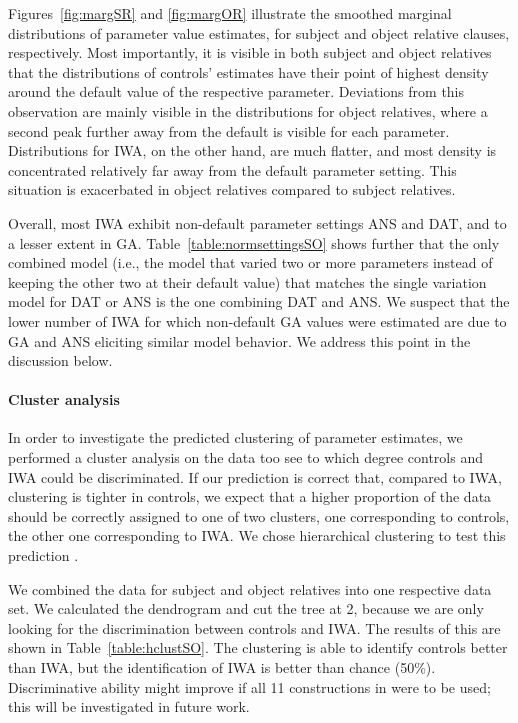 \documentclass{cambridge7A}\usepackage[]{graphicx}\usepackage[]{color}
\begin{document}
Figures~\ref{fig:margSR} and \ref{fig:margOR} illustrate the smoothed marginal distributions of parameter value estimates, for subject and object relative clauses, respectively. Most importantly, it is visible in both subject and object relatives that the distributions of controls' estimates have their point of highest density around the default value of the respective parameter. Deviations from this observation are mainly visible in the distributions for object relatives, where a second peak further away from the default is visible for each parameter. Distributions for IWA, on the other hand, are much flatter, and most density is concentrated relatively far away from the default parameter setting. This situation is exacerbated in object relatives compared to subject relatives.

Overall, most IWA exhibit non-default parameter settings ANS and DAT, and to a lesser extent in GA. Table~\ref{table:normsettingsSO} shows further that the only combined model (i.e., the model that varied two or more parameters instead of keeping the other two at their default value) that matches the single variation model for DAT or ANS is the one combining DAT and ANS. We suspect that the lower number of IWA for which non-default GA values were estimated are due to GA and ANS eliciting similar model behavior.
We address this point in the discussion below.

\paragraph{Cluster analysis} In order to investigate the
 predicted clustering of parameter estimates, we performed a cluster analysis on the data too see to which degree controls and IWA could be discriminated.
If our prediction is correct that, compared to IWA, clustering is tighter in controls, we expect that a higher proportion of the data should be correctly assigned to one of two clusters, one corresponding to controls, the other one corresponding to IWA. We chose hierarchical clustering to test this prediction \citep{friedman2001elements}.

We combined the data for subject and object relatives into one respective data set.
We calculated the dendrogram and cut the tree at 2, because we are only looking for the discrimination between controls and IWA. The results of this are shown in Table~\ref{table:hclustSO}. The clustering is able to identify controls better than IWA, but the identification of IWA is better than chance (50\%). 
Discriminative ability might improve if all 11 constructions in \cite{CaplanEtAl2015} were to be used; this will be investigated in future work.
\end{document}
